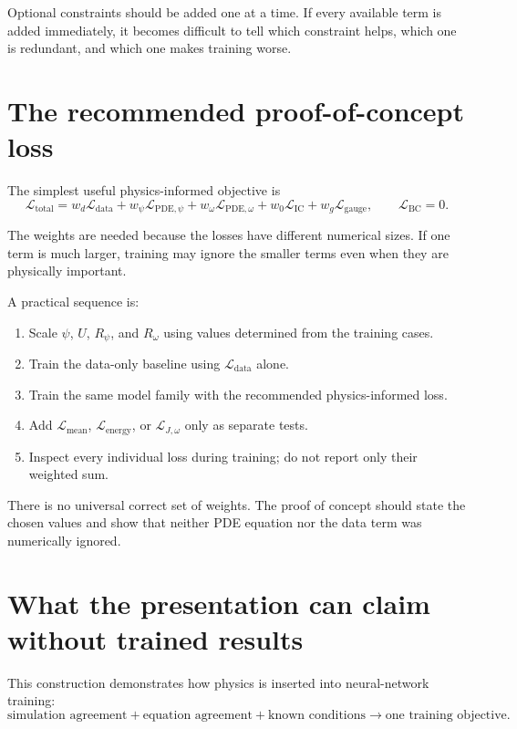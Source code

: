 \documentclass[11pt]{article}
\newcommand{\Rpsi}{R_{\psi}}
\newcommand{\Romega}{R_{\omega}}
\newcommand{\Ldata}{\mathcal L_{\mathrm{data}}}
\newcommand{\Lpdepsi}{\mathcal L_{\mathrm{PDE},\psi}}
\newcommand{\Lpdeomega}{\mathcal L_{\mathrm{PDE},\omega}}
\newcommand{\Lic}{\mathcal L_{\mathrm{IC}}}
\newcommand{\Lbc}{\mathcal L_{\mathrm{BC}}}
\newcommand{\Lgauge}{\mathcal L_{\mathrm{gauge}}}
\newcommand{\Lmean}{\mathcal L_{\mathrm{mean}}}
\newcommand{\Lenergy}{\mathcal L_{\mathrm{energy}}}
\newcommand{\Lderived}{\mathcal L_{J,\omega}}
\newcommand{\Ltotal}{\mathcal L_{\mathrm{total}}}
\begin{document}
\begin{notebox}
Optional constraints should be added one at a time. If every available term is added immediately, it becomes difficult to tell which constraint helps, which one is redundant, and which one makes training worse.
\end{notebox}

\section{The recommended proof-of-concept loss}

The simplest useful physics-informed objective is
\begin{equation}
\boxed{
\Ltotal
=w_d\Ldata
+w_{\psi}\Lpdepsi
+w_{\omega}\Lpdeomega
+w_0\Lic
+w_g\Lgauge,
\qquad
\Lbc=0.
}
\label{eq:recommended_loss}
\end{equation}

The weights are needed because the losses have different numerical sizes. If one term is much larger, training may ignore the smaller terms even when they are physically important.

A practical sequence is:
\begin{enumerate}[leftmargin=2em]
\item Scale $\psi$, $U$, $\Rpsi$, and $\Romega$ using values determined from the training cases.
\item Train the data-only baseline using $\Ldata$ alone.
\item Train the same model family with the recommended physics-informed loss.
\item Add $\Lmean$, $\Lenergy$, or $\Lderived$ only as separate tests.
\item Inspect every individual loss during training; do not report only their weighted sum.
\end{enumerate}

There is no universal correct set of weights. The proof of concept should state the chosen values and show that neither PDE equation nor the data term was numerically ignored.

\section{What the presentation can claim without trained results}

This construction demonstrates how physics is inserted into neural-network training:
\begin{equation}
\text{simulation agreement}
+\text{equation agreement}
+\text{known conditions}
\longrightarrow
\text{one training objective}.
\end{equation}
\end{document}
